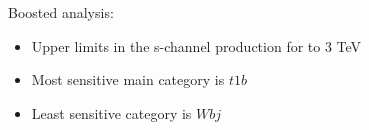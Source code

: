 {{        \vspace{0.75cm}

        \footnotesize
        Boosted analysis:
        
        \begin{itemize}
        \item Upper limits in the s-channel
          production for  to 3 TeV
        \item Most sensitive main category is $t1b$
        \item Least sensitive category is $Wbj$
        \end{itemize}
      }
}

